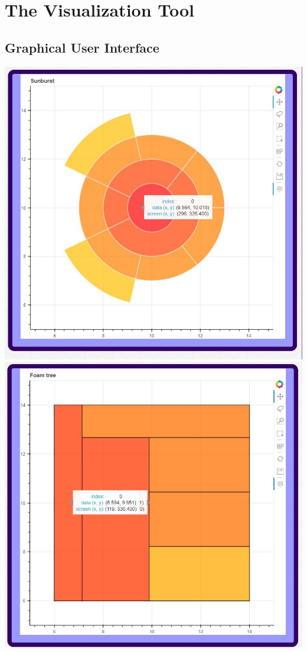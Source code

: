 \documentclass[journal, 9pt]{vgtc}                %
\begin{document}
\section{The Visualization Tool}

\subsection{Graphical User Interface}

\includegraphics[width=\linewidth]{vis3.jpg}
\includegraphics[width=\linewidth]{vis4.jpg}
\end{document}
